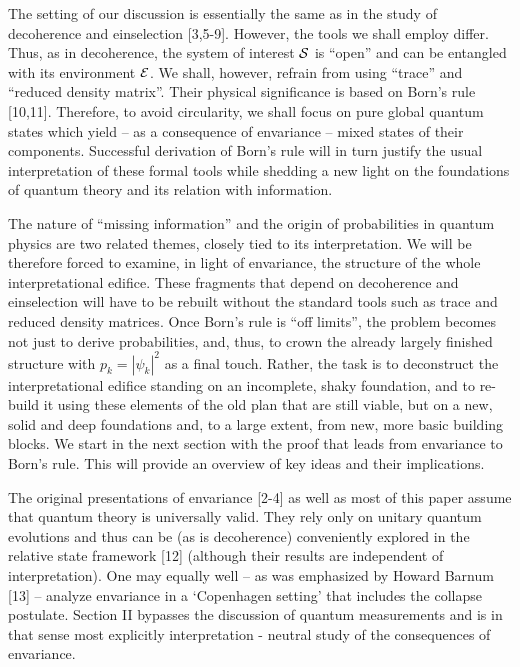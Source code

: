 \documentclass[aps,pra,epsfig,11pt,floatfix]{revtex4}
\begin{document}
The setting of our discussion is essentially the same as in the study of 
decoherence and einselection [3,5-9]. However, the tools we shall
employ differ. Thus, as in decoherence, the system of interest ${\cal S}$ 
is ``open'' and can be entangled with its environment ${\cal E}$. We shall, 
however, refrain from using ``trace'' and ``reduced density matrix''.  Their
physical significance is based on Born's rule [10,11]. Therefore, to avoid 
circularity, we shall focus on pure global quantum states which yield -- 
as a consequence of envariance -- mixed states of their components. 
Successful derivation of Born's rule will in turn justify the usual interpretation 
of these formal tools while shedding a new light on the foundations of 
quantum theory and its relation with information.

The nature of  ``missing information'' and the origin of probabilities in
quantum physics are two related themes, closely tied to its interpretation.
We will be therefore forced to examine, in light of envariance, the structure
of the whole interpretational edifice. These fragments that depend on 
decoherence and einselection will have to be rebuilt without the standard 
tools such as trace and reduced density matrices. Once Born's rule is
``off limits'', the problem becomes not just to derive probabilities, and,
thus, to crown the already largely finished structure with $p_k=|\psi_k|^2$
as a final touch. Rather, the task is to deconstruct the interpretational
edifice standing on an incomplete, shaky foundation, and to re-build it using
these elements of the old plan that are still viable, but on a new, solid and
deep foundations and, to a large extent, from new, more basic building blocks.
We start in the next section with the proof that leads from envariance to
Born's rule. This will provide an overview of key ideas and their implications.

The original presentations of envariance [2-4] as well as most of this paper 
assume that quantum theory is universally valid. They rely only on unitary 
quantum evolutions and thus can be (as is decoherence) conveniently explored 
in the relative state framework [12] (although their results are independent of
interpretation). One may equally well -- as was emphasized by Howard Barnum [13] 
-- analyze envariance in a `Copenhagen setting' that includes the collapse postulate. 
Section II bypasses the discussion of quantum measurements and is in that sense
most explicitly interpretation - neutral study of the consequences of envariance.
\end{document}
